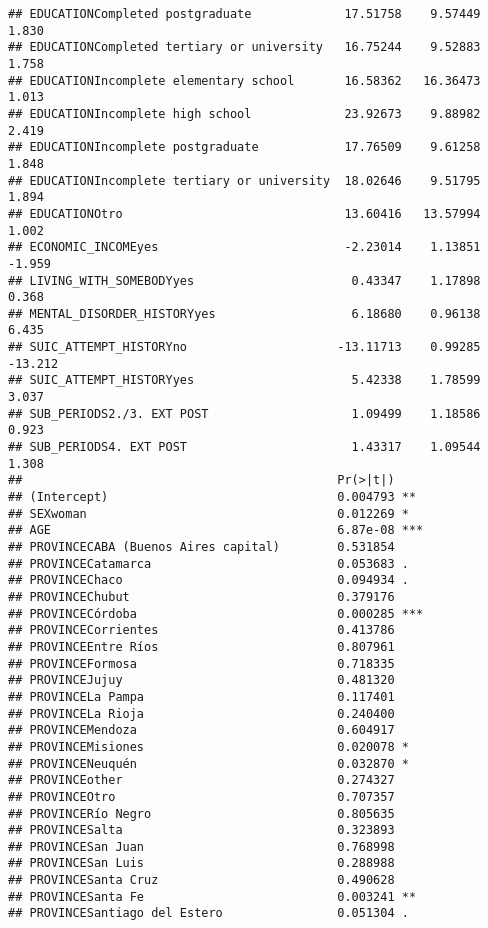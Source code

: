 \documentclass[
]{book}
\begin{document}
\begin{verbatim}
## EDUCATIONCompleted postgraduate             17.51758    9.57449   1.830
## EDUCATIONCompleted tertiary or university   16.75244    9.52883   1.758
## EDUCATIONIncomplete elementary school       16.58362   16.36473   1.013
## EDUCATIONIncomplete high school             23.92673    9.88982   2.419
## EDUCATIONIncomplete postgraduate            17.76509    9.61258   1.848
## EDUCATIONIncomplete tertiary or university  18.02646    9.51795   1.894
## EDUCATIONOtro                               13.60416   13.57994   1.002
## ECONOMIC_INCOMEyes                          -2.23014    1.13851  -1.959
## LIVING_WITH_SOMEBODYyes                      0.43347    1.17898   0.368
## MENTAL_DISORDER_HISTORYyes                   6.18680    0.96138   6.435
## SUIC_ATTEMPT_HISTORYno                     -13.11713    0.99285 -13.212
## SUIC_ATTEMPT_HISTORYyes                      5.42338    1.78599   3.037
## SUB_PERIODS2./3. EXT POST                    1.09499    1.18586   0.923
## SUB_PERIODS4. EXT POST                       1.43317    1.09544   1.308
##                                            Pr(>|t|)    
## (Intercept)                                0.004793 ** 
## SEXwoman                                   0.012269 *  
## AGE                                        6.87e-08 ***
## PROVINCECABA (Buenos Aires capital)        0.531854    
## PROVINCECatamarca                          0.053683 .  
## PROVINCEChaco                              0.094934 .  
## PROVINCEChubut                             0.379176    
## PROVINCECórdoba                            0.000285 ***
## PROVINCECorrientes                         0.413786    
## PROVINCEEntre Ríos                         0.807961    
## PROVINCEFormosa                            0.718335    
## PROVINCEJujuy                              0.481320    
## PROVINCELa Pampa                           0.117401    
## PROVINCELa Rioja                           0.240400    
## PROVINCEMendoza                            0.604917    
## PROVINCEMisiones                           0.020078 *  
## PROVINCENeuquén                            0.032870 *  
## PROVINCEother                              0.274327    
## PROVINCEOtro                               0.707357    
## PROVINCERío Negro                          0.805635    
## PROVINCESalta                              0.323893    
## PROVINCESan Juan                           0.768998    
## PROVINCESan Luis                           0.288988    
## PROVINCESanta Cruz                         0.490628    
## PROVINCESanta Fe                           0.003241 ** 
## PROVINCESantiago del Estero                0.051304 .  

\end{verbatim}
\end{document}
